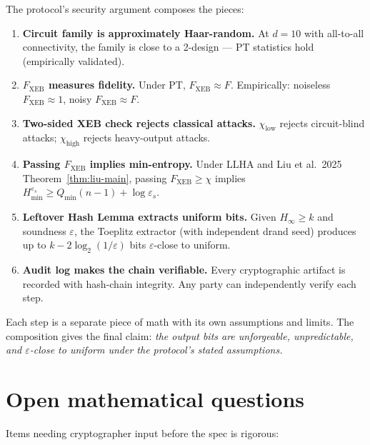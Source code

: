 \documentclass[11pt,a4paper]{article}
\theoremstyle{plain}
\theoremstyle{definition}
\theoremstyle{remark}
\newcommand{\Hmin}{H_{\infty}}
\newcommand{\Hsmin}[1][\varepsilon_s]{H^{#1}_{\min}}
\begin{document}
The protocol's security argument composes the pieces:
\begin{enumerate}[itemsep=4pt,topsep=4pt]
  \item \textbf{Circuit family is approximately Haar-random.} At $d=10$ with all-to-all connectivity, the family is close to a 2-design --- PT statistics hold (empirically validated).

  \item \textbf{$F_{\mathrm{XEB}}$ measures fidelity.} Under PT, $F_{\mathrm{XEB}} \approx F$. Empirically: noiseless $F_{\mathrm{XEB}} \approx 1$, noisy $F_{\mathrm{XEB}} \approx F$.

  \item \textbf{Two-sided XEB check rejects classical attacks.} $\chi_{\mathrm{low}}$ rejects circuit-blind attacks; $\chi_{\mathrm{high}}$ rejects heavy-output attacks.

  \item \textbf{Passing $F_{\mathrm{XEB}}$ implies min-entropy.} Under LLHA and Liu et al.\ 2025 Theorem~\ref{thm:liu-main}, passing $F_{\mathrm{XEB}} \geq \chi$ implies $\Hsmin \geq Q_{\min}(n-1) + \log \varepsilon_s$.

  \item \textbf{Leftover Hash Lemma extracts uniform bits.} Given $\Hmin \geq k$ and soundness $\varepsilon$, the Toeplitz extractor (with independent drand seed) produces up to $k - 2\log_2(1/\varepsilon)$ bits $\varepsilon$-close to uniform.

  \item \textbf{Audit log makes the chain verifiable.} Every cryptographic artifact is recorded with hash-chain integrity. Any party can independently verify each step.
\end{enumerate}

Each step is a separate piece of math with its own assumptions and limits. The composition gives the final claim: \emph{the output bits are unforgeable, unpredictable, and $\varepsilon$-close to uniform under the protocol's stated assumptions.}

\section{Open mathematical questions}

Items needing cryptographer input before the spec is rigorous:
\end{document}
